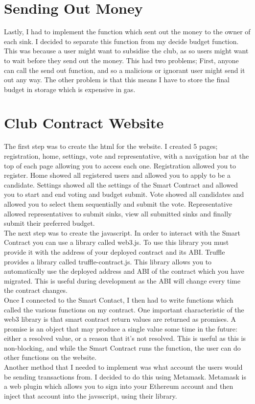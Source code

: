 \section{Sending Out Money}
Lastly, I had to implement the function which sent out the money to the owner of each sink. I decided to separate this function from my decide budget function. This was because a user might want to subsidise the club, as so users might want to wait before they send out the money. This had two problems; First, anyone can call the send out function, and so a malicious or ignorant user might send it out any way. The other problem is that this means I have to store the final budget in storage which is expensive in gas.  
\section{Club Contract Website}
The first step was to create the html for the website. I created 5 pages; registration, home, settings, vote and representative, with a navigation bar at the top of each page allowing you to access each one. Registration allowed you to register. Home showed all registered users and allowed you to apply to be a candidate. Settings showed all the settings of the Smart Contract and allowed you to start and end voting and budget submit. Vote showed all candidates and allowed you to select them sequentially and submit the vote. Representative allowed representatives to submit sinks, view all submitted sinks and finally submit their preferred budget. \\
 The next step was to create the javascript. In order to interact with the Smart Contract you can use a library called web3.js. To use this library you must provide it with the address of your deployed contract and its ABI. Truffle provides a library called truffle-contract.js. This library allows you to automatically use the deployed address and ABI of the contract which you have migrated. This is useful during development  as the ABI will change every time the contract changes. \\
Once I connected to the Smart Contact, I then had to write functions which called the various functions on my contract. One important characteristic of the web3 library is that smart contract return values are returned as promises. A promise is an object that may produce a single value some time in the future: either a resolved value, or a reason that it’s not resolved. This is useful as this is non-blocking, and while the Smart Contract runs the function, the user can do other functions on the website. \\
Another method that I needed to implement was what account the users would be sending transactions from. I decided to do this using Metamask. Metamask is a web plugin which allows you to sign into your Ethereum account and then inject that account into the javsscript, using their library.